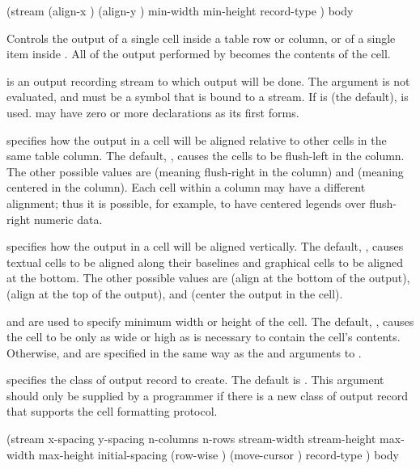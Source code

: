  {(\optional stream
                              \key (align-x ) (align-y ) 
                                   min-width min-height record-type \allow)
                             \body body}

Controls the output of a single cell inside a table row or column, or of a
single item inside .  All of the output performed by
 becomes the contents of the cell.

 is an output recording stream to which output will be done.  The
 argument is not evaluated, and must be a symbol that is bound to a
stream.  If  is  (the default),  is
used.   may have zero or more declarations as its first forms.

 specifies how the output in a cell will be aligned relative to
other cells in the same table column.  The default, , causes the cells
to be flush-left in the column.  The other possible values are 
(meaning flush-right in the column) and  (meaning centered in the
column).  Each cell within a column may have a different alignment; thus it is
possible, for example, to have centered legends over flush-right numeric data.

 specifies how the output in a cell will be aligned vertically.
The default, , causes textual cells to be aligned along their
baselines and graphical cells to be aligned at the bottom.  The other possible
values are  (align at the bottom of the output),  (align at
the top of the output), and  (center the output in the cell).

 and  are used to specify minimum width or height
of the cell.  The default, , causes the cell to be only as wide or high
as is necessary to contain the cell's contents.  Otherwise,  and
 are specified in the same way as the  and
 arguments to .

 specifies the class of output record to create.  The default
is .  This argument should only be supplied by
a programmer if there is a new class of output record that supports the cell
formatting protocol.


 {(\optional stream
                                   \key x-spacing y-spacing
                                        n-columns n-rows 
                                        stream-width stream-height max-width max-height
                                        initial-spacing (row-wise )
                                        (move-cursor ) record-type \allow) 
                                  \body body}

